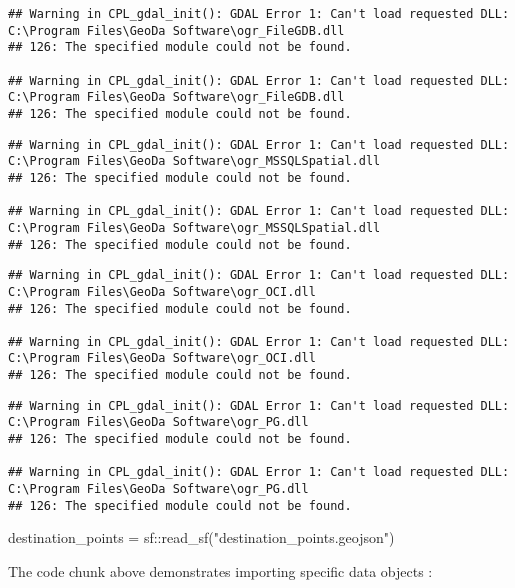 \documentclass[11pt,letterpaper]{article}
\newenvironment{Shaded}{\begin{snugshade}}{\end{snugshade}}
\newcommand{\FunctionTok}[1]{\textcolor[rgb]{0.00,0.00,0.00}{#1}}
\newcommand{\NormalTok}[1]{#1}
\newcommand{\OtherTok}[1]{\textcolor[rgb]{0.56,0.35,0.01}{#1}}
\newcommand{\SpecialCharTok}[1]{\textcolor[rgb]{0.00,0.00,0.00}{#1}}
\newcommand{\StringTok}[1]{\textcolor[rgb]{0.31,0.60,0.02}{#1}}
\begin{document}
\begin{verbatim}
## Warning in CPL_gdal_init(): GDAL Error 1: Can't load requested DLL: C:\Program Files\GeoDa Software\ogr_FileGDB.dll
## 126: The specified module could not be found.

## Warning in CPL_gdal_init(): GDAL Error 1: Can't load requested DLL: C:\Program Files\GeoDa Software\ogr_FileGDB.dll
## 126: The specified module could not be found.
\end{verbatim}

\begin{verbatim}
## Warning in CPL_gdal_init(): GDAL Error 1: Can't load requested DLL: C:\Program Files\GeoDa Software\ogr_MSSQLSpatial.dll
## 126: The specified module could not be found.

## Warning in CPL_gdal_init(): GDAL Error 1: Can't load requested DLL: C:\Program Files\GeoDa Software\ogr_MSSQLSpatial.dll
## 126: The specified module could not be found.
\end{verbatim}

\begin{verbatim}
## Warning in CPL_gdal_init(): GDAL Error 1: Can't load requested DLL: C:\Program Files\GeoDa Software\ogr_OCI.dll
## 126: The specified module could not be found.

## Warning in CPL_gdal_init(): GDAL Error 1: Can't load requested DLL: C:\Program Files\GeoDa Software\ogr_OCI.dll
## 126: The specified module could not be found.
\end{verbatim}

\begin{verbatim}
## Warning in CPL_gdal_init(): GDAL Error 1: Can't load requested DLL: C:\Program Files\GeoDa Software\ogr_PG.dll
## 126: The specified module could not be found.

## Warning in CPL_gdal_init(): GDAL Error 1: Can't load requested DLL: C:\Program Files\GeoDa Software\ogr_PG.dll
## 126: The specified module could not be found.
\end{verbatim}

\begin{Shaded}
\begin{Highlighting}[]
\NormalTok{destination\_points }\OtherTok{=}\NormalTok{ sf}\SpecialCharTok{::}\FunctionTok{read\_sf}\NormalTok{(}\StringTok{"destination\_points.geojson"}\NormalTok{)}
\end{Highlighting}
\end{Shaded}

The code chunk above demonstrates importing specific data objects :
\end{document}
